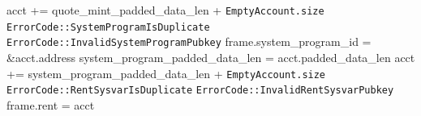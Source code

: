\begin{algorithm}
\begin{algorithmic}
  \STATE acct += quote\_mint\_padded\_data\_len + \texttt{EmptyAccount.size}
    \RETURN \texttt{ErrorCode::SystemProgramIsDuplicate}
  \ENDIF
    \RETURN \texttt{ErrorCode::InvalidSystemProgramPubkey}
  \ENDIF
  \STATE frame.system\_program\_id = \&acct.address
  \STATE system\_program\_padded\_data\_len = acct.padded\_data\_len
  \STATE acct += system\_program\_padded\_data\_len + \texttt{EmptyAccount.size}
    \RETURN \texttt{ErrorCode::RentSysvarIsDuplicate}
  \ENDIF
    \RETURN \texttt{ErrorCode::InvalidRentSysvarPubkey}
  \ENDIF
  \STATE frame.rent = acct
\ENDPROCEDURE
\end{algorithmic}
\end{algorithm}
